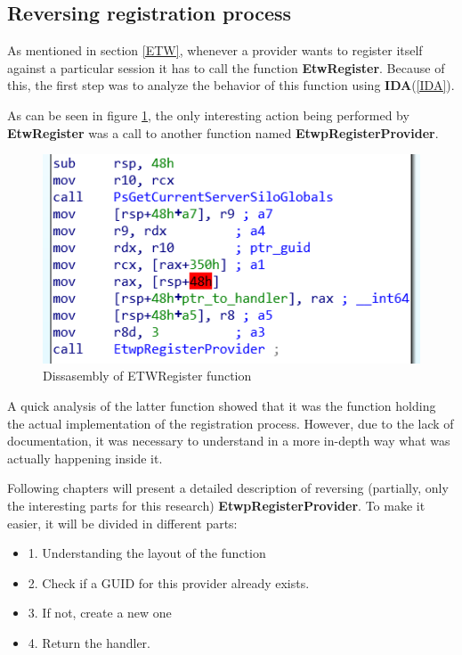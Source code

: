 \subsection{Reversing registration process}\label{reversing_registration_process}
As mentioned in section \ref{ETW}, whenever a provider wants to register itself against a particular session it has to call the function {\bfseries EtwRegister}. Because of this, the first step was to analyze the behavior of this function using {\bfseries IDA}(\ref{IDA}). 

As can be seen in figure \ref{fig:etwRegister_code}, the only interesting action being performed by {\bfseries EtwRegister} was a call to another function named {\bfseries EtwpRegisterProvider}. 

\begin{centering}
\begin{figure}[H]
  \includegraphics[width=12cm]{images/etwRegister_code.png}
  \caption[]{Dissasembly of ETWRegister function}
  \label{fig:etwRegister_code}
\end{figure}
\end{centering}

A quick analysis of the latter function showed that it was the function holding the actual implementation of the registration process. However, due to the lack of documentation, it was necessary to understand in a more in-depth way what was actually happening inside it.

Following chapters will present a detailed description of reversing (partially, only the interesting parts for this research) {\bfseries EtwpRegisterProvider}. 
To make it easier, it will be divided in different parts:

\begin{itemize}
  \setlength\itemsep{0.05em}
  \item 1. Understanding the layout of the function
  \item 2. Check if a GUID for this provider already exists.
  \item 3. If not, create a new one
  \item 4. Return the handler.
\end{itemize}

